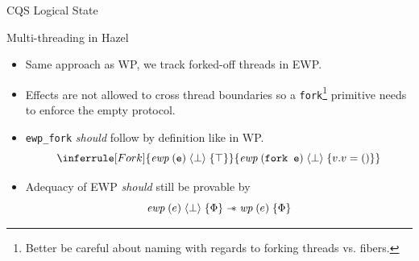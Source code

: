 \documentclass[aspectratio=43]{beamer}
\newcommand{\ocaml}[1]{\texttt{#1}}
\newcommand{\coq}[1]{\texttt{#1}}
\newcommand{\wand}{\mathrel{-\mkern-6mu*}}
\newcommand{\ewp}[3]{\textit{ewp}\; (#1)\; \langle #2 \rangle\; \{#3\}}
\newcommand{\iriswp}[2]{\textit{wp}\; (#1)\; \{#2\}}
\begin{document}
\begin{frame}[fragile]{CQS Logical State}
\end{frame}

\begin{frame}{Multi-threading in Hazel}
    \begin{itemize}
        \item Same approach as WP, we track forked-off threads in EWP.
        \item Effects are not allowed to cross thread boundaries so a \ocaml{fork}\footnote{Better be careful about naming with regards to forking threads vs. fibers.} primitive needs to enforce the empty protocol.
        \item \coq{ewp_fork} \textit{should} follow by definition like in WP.
              \[
                  \inferrule [Fork]
                  {\ewp{\texttt{e}}{\bot}{\top}}
                  {\ewp{\texttt{fork e}}{\bot}{v. v = ()}}
              \]
        \item Adequacy of EWP \textit{should} still be provable by
              \[
                  \ewp{e}{\bot}{\Phi} \wand{} \iriswp{e}{\Phi}
              \]
    \end{itemize}
\end{frame}
\end{document}
